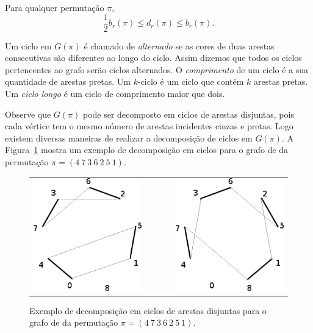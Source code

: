 \begin{teo}
\label{teo:rev_bkp_bound}
Para qualquer permutação $\pi$, 
\[\frac{1}{2} b_r(\pi) \leq d_r(\pi) \leq
  b_r(\pi).
\]
\end{teo}

Um ciclo em $G(\pi)$ é chamado de \textit{alternado} se as cores de
duas arestas consecutivas são diferentes ao longo do ciclo. Assim
dizemos que todos os ciclos pertencentes ao grafo serão ciclos
alternados. O \textit{comprimento} de um ciclo é a sua quantidade de
arestas pretas. Um $k$-ciclo é um ciclo que contém $k$ arestas
pretas. Um \textit{ciclo longo} é um ciclo de comprimento maior que
dois.

Observe que $G(\pi)$ pode ser decomposto em ciclos de arestas
disjuntas, pois cada vértice tem o mesmo número de arestas incidentes
cinzas e pretas. Logo existem diversas maneiras de realizar a
decomposição de ciclos em $G(\pi)$. A
Figura~\ref{fig:rev_grafo_bkp_dec2cic} mostra um exemplo de
decomposição em ciclos para o grafo de \bkp{} da permutação $\pi =
(4~7~3~6~2~5~1)$.

\begin{figure}[h]
  \centering 
  \begin{tabular}{ccc} 
  \includegraphics[scale=0.6]{images/rev_grafo_bkp_dec2cic-1.png}
  & ~~~~
  & \includegraphics[scale=0.6]{images/rev_grafo_bkp_dec2cic-2.png} 
  \end{tabular} 
  \caption{Exemplo de decomposição em ciclos de arestas disjuntas para
  o grafo de \bkp{} da permutação $\pi = (4~7~3~6~2~5~1)$.}
  \label{fig:rev_grafo_bkp_dec2cic}
\end{figure}

